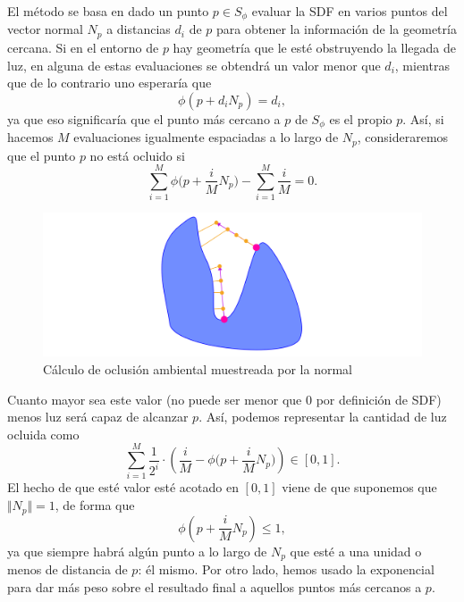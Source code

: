 El método se basa en dado un punto $p\in S_{\phi}$ evaluar la SDF en varios puntos del vector normal $N_p$ a distancias $d_i$ de $p$ para obtener la información de la geometría cercana. Si en el entorno de $p$ hay geometría que le esté obstruyendo la llegada de luz, en alguna de estas evaluaciones se obtendrá un valor menor que $d_i$, mientras que de lo contrario uno esperaría que
\begin{equation*}
    \phi(p + d_i N_p) = d_i,
\end{equation*}
ya que eso significaría que el punto más cercano a $p$ de $S_{\phi}$ es el propio $p$. Así, si hacemos $M$ evaluaciones igualmente espaciadas a lo largo de $N_p$, consideraremos que el punto $p$ no está ocluido si
\begin{equation*}
    \sum_{i=1}^M \phi\Big(p + \frac{i}{M} N_p\Big) - \sum_{i=1}^M \frac{i}{M} = 0.
\end{equation*}
\begin{figure}[ht!]
    \centering
    \includegraphics[width=\textwidth]{Plantilla-TFG-master/img/diagramaAO.png}
    \caption{Cálculo de oclusión ambiental muestreada por la normal}
    \label{fig:sombras4}
\end{figure}
Cuanto mayor sea este valor (no puede ser menor que $0$ por definición de SDF) menos luz será capaz de alcanzar $p$. Así, podemos representar la cantidad de luz ocluida como
\begin{equation*}
    \sum_{i=1}^M \frac{1}{2^i}\cdot \left(\frac{i}{M} - \phi\Big(p + \frac{i}{M} N_p\Big)\right)\in [0,1].
\end{equation*}
El hecho de que esté valor esté acotado en $[0,1]$ viene de que suponemos que $\Vert N_p\Vert = 1$, de forma que
\begin{equation*}
    \phi\left(p + \frac{i}{M} N_p\right) \le 1,
\end{equation*}
ya que siempre habrá algún punto a lo largo de $N_p$ que esté a una unidad o menos de distancia de $p$: él mismo. Por otro lado, hemos usado la exponencial para dar más peso sobre el resultado final a aquellos puntos más cercanos a $p$.\newline

